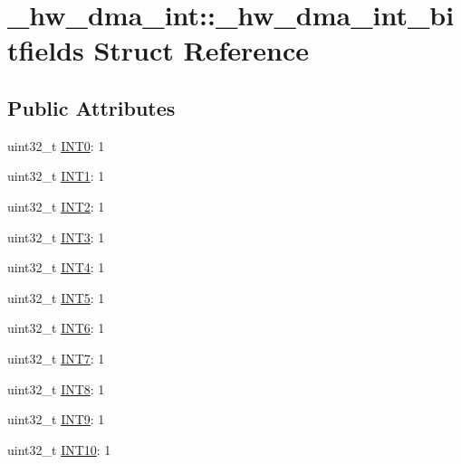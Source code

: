 \hypertarget{struct__hw__dma__int_1_1__hw__dma__int__bitfields}{}\section{\+\_\+hw\+\_\+dma\+\_\+int\+:\+:\+\_\+hw\+\_\+dma\+\_\+int\+\_\+bitfields Struct Reference}
\label{struct__hw__dma__int_1_1__hw__dma__int__bitfields}
\subsection*{Public Attributes}
\begin{DoxyCompactItemize}
\item 
uint32\+\_\+t \hyperlink{struct__hw__dma__int_1_1__hw__dma__int__bitfields_a0484e9243f0e9091cd0d3dbf4db85f1d}{I\+N\+T0}\+: 1
\item 
uint32\+\_\+t \hyperlink{struct__hw__dma__int_1_1__hw__dma__int__bitfields_abf365874ca10168af83bc7c9145c5769}{I\+N\+T1}\+: 1
\item 
uint32\+\_\+t \hyperlink{struct__hw__dma__int_1_1__hw__dma__int__bitfields_a5c5607a48068ef8cf08c899d552a0db4}{I\+N\+T2}\+: 1
\item 
uint32\+\_\+t \hyperlink{struct__hw__dma__int_1_1__hw__dma__int__bitfields_a99fe612f066a30995329035857a8a69a}{I\+N\+T3}\+: 1
\item 
uint32\+\_\+t \hyperlink{struct__hw__dma__int_1_1__hw__dma__int__bitfields_a2921cf6d2fc0f42f01d8e4a2d782973d}{I\+N\+T4}\+: 1
\item 
uint32\+\_\+t \hyperlink{struct__hw__dma__int_1_1__hw__dma__int__bitfields_ac71a301443fc30b998df0641047f81b7}{I\+N\+T5}\+: 1
\item 
uint32\+\_\+t \hyperlink{struct__hw__dma__int_1_1__hw__dma__int__bitfields_aa5ff4aa6e907517e71db7d912fcb420a}{I\+N\+T6}\+: 1
\item 
uint32\+\_\+t \hyperlink{struct__hw__dma__int_1_1__hw__dma__int__bitfields_a713746032d35bdd84755ef38b1ecec21}{I\+N\+T7}\+: 1
\item 
uint32\+\_\+t \hyperlink{struct__hw__dma__int_1_1__hw__dma__int__bitfields_aa70760c2a5fdaeb41572d8c61cd0c4e3}{I\+N\+T8}\+: 1
\item 
uint32\+\_\+t \hyperlink{struct__hw__dma__int_1_1__hw__dma__int__bitfields_a04bdf8d323aa213a99c1d4d118fa77c6}{I\+N\+T9}\+: 1
\item 
uint32\+\_\+t \hyperlink{struct__hw__dma__int_1_1__hw__dma__int__bitfields_a53f09b330b3a12e861df3ca384dd0dda}{I\+N\+T10}\+: 1

\end{DoxyCompactItemize}
